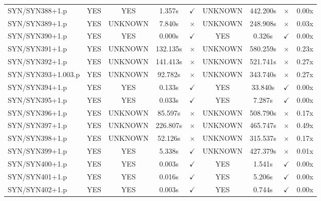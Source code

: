 \documentclass[a4paper,10pt]{article}
\begin{document}
\begin{longtable}{lcccccccc}
SYN/SYN388+1.p & YES & YES & 1.357s & \cellcolor{matchcolor}$\checkmark$ & UNKNOWN & 442.200s & \cellcolor{mismatchcolor}$\times$ & 0.00x \\
SYN/SYN389+1.p & YES & UNKNOWN & 7.840s & \cellcolor{mismatchcolor}$\times$ & UNKNOWN & 248.908s & \cellcolor{mismatchcolor}$\times$ & 0.03x \\
SYN/SYN390+1.p & YES & YES & 0.000s & \cellcolor{matchcolor}$\checkmark$ & YES & 0.326s & \cellcolor{matchcolor}$\checkmark$ & 0.00x \\
SYN/SYN391+1.p & YES & UNKNOWN & 132.135s & \cellcolor{mismatchcolor}$\times$ & UNKNOWN & 580.259s & \cellcolor{mismatchcolor}$\times$ & 0.23x \\
SYN/SYN392+1.p & YES & UNKNOWN & 141.413s & \cellcolor{mismatchcolor}$\times$ & UNKNOWN & 521.741s & \cellcolor{mismatchcolor}$\times$ & 0.27x \\
SYN/SYN393+1.003.p & YES & UNKNOWN & 92.782s & \cellcolor{mismatchcolor}$\times$ & UNKNOWN & 343.740s & \cellcolor{mismatchcolor}$\times$ & 0.27x \\
SYN/SYN394+1.p & YES & YES & 0.133s & \cellcolor{matchcolor}$\checkmark$ & YES & 33.840s & \cellcolor{matchcolor}$\checkmark$ & 0.00x \\
SYN/SYN395+1.p & YES & YES & 0.033s & \cellcolor{matchcolor}$\checkmark$ & YES & 7.287s & \cellcolor{matchcolor}$\checkmark$ & 0.00x \\
SYN/SYN396+1.p & YES & UNKNOWN & 85.597s & \cellcolor{mismatchcolor}$\times$ & UNKNOWN & 508.790s & \cellcolor{mismatchcolor}$\times$ & 0.17x \\
SYN/SYN397+1.p & YES & UNKNOWN & 226.807s & \cellcolor{mismatchcolor}$\times$ & UNKNOWN & 465.747s & \cellcolor{mismatchcolor}$\times$ & 0.49x \\
SYN/SYN398+1.p & YES & UNKNOWN & 52.126s & \cellcolor{mismatchcolor}$\times$ & UNKNOWN & 315.537s & \cellcolor{mismatchcolor}$\times$ & 0.17x \\
SYN/SYN399+1.p & YES & YES & 5.338s & \cellcolor{matchcolor}$\checkmark$ & UNKNOWN & 427.379s & \cellcolor{mismatchcolor}$\times$ & 0.01x \\
SYN/SYN400+1.p & YES & YES & 0.003s & \cellcolor{matchcolor}$\checkmark$ & YES & 1.541s & \cellcolor{matchcolor}$\checkmark$ & 0.00x \\
SYN/SYN401+1.p & YES & YES & 0.016s & \cellcolor{matchcolor}$\checkmark$ & YES & 5.206s & \cellcolor{matchcolor}$\checkmark$ & 0.00x \\
SYN/SYN402+1.p & YES & YES & 0.003s & \cellcolor{matchcolor}$\checkmark$ & YES & 0.744s & \cellcolor{matchcolor}$\checkmark$ & 0.00x \\

\end{longtable}
\end{document}
